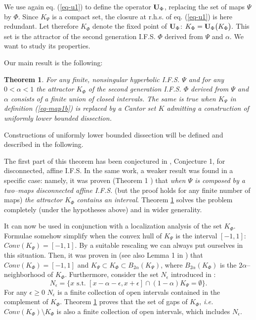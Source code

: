 \documentclass[final,epsfig,amsfont]{article}
\newtheorem{theorem}{Theorem}[section]
\begin{document}
We use again eq. (\ref{eq-u1}) to define the operator ${{\bf U}_{\Phi}}$, replacing the set of maps $\Psi$ by $\Phi$. Since $K_\Psi$ is a compact set, the closure at r.h.s. of eq. (\ref{eq-u1}) is here redundant.
Let therefore $K_\Phi$ denote the fixed point of ${{\bf U}_{\Phi}}$:
$
K_\Phi={{\bf U}_{\Phi}}\big(K_\Phi\big).
$
This set is the attractor of the {second generation I.F.S. $\Phi$ derived from $\Psi$ and $\alpha$}. We want to study its properties.

Our main result is the following: 
\begin{theorem}
For any finite, nonsingular hyperbolic I.F.S. $\Psi$
and for any $0<\alpha<1$ the attractor $K_\Phi$ of the second generation I.F.S. $\Phi$ derived from $\Psi$ and $\alpha$ consists of a finite union of closed intervals.
The same is true when $K_\Psi$ in definition (\ref{eq-map1b}) is replaced by a Cantor set $K$ admitting a construction of uniformly lower bounded dissection.
\label{teo-1}
\end{theorem}
Constructions of uniformly lower bounded dissection will be defined and described in the following.

The first part of this theorem has been conjectured in \cite{intj}, Conjecture 1, for disconnected, affine I.F.S. In the same work, a weaker result was found in a specific case: namely, it was proven (Theorem 1 \cite{intj}) that {\em when $\Psi$ is composed by a two--maps disconnected affine I.F.S. }(but the proof holds for any finite number of maps) {\em the attractor $K_\Phi$ contains an interval}.
Theorem \ref{teo-1} solves the problem completely (under the hypotheses above) and in wider generality.

It can now be used in conjunction with a localization analysis of the set $K_\Phi$. Formulae somehow simplify when the convex hull of $K_\Psi$ is the interval $[-1,1]$: ${{Conv}}(K_\Psi)=[-1,1]$. By a suitable rescaling we can always put ourselves in this situation. Then, it was proven in \cite{nalgo2,arxiv} (see also Lemma 1 in \cite{intj}) that ${{Conv}}(K_\Phi)=[-1,1]$ and
$ K_\Psi \subset K_\Phi \subset B_{2 \alpha}(K_\Psi)$, where $B_{2 \alpha}(K_\Phi)$ is the $2 \alpha$--neighborhood of $K_\Phi$.  Furthermore, consider the set $N_{\epsilon}$ introduced in \cite{intj}:
\begin{equation}
N_{\epsilon} = \{ x \mbox{ s.t. }
[x - \alpha - \epsilon, x + \epsilon] \cap (1-\alpha) K_\Psi = \emptyset \} .
\label{eq-neps}
\end{equation}
For any $\epsilon \geq 0$ $N_{\epsilon}$ is a finite collection of open intervals contained in the complement of $K_\Phi$. Theorem \ref{teo-1} proves that the set of gaps of $K_\Phi$, {\em i.e.}  ${{Conv}}(K_\Phi) \setminus K_\Phi$ is also a finite collection of open intervals, which includes $N_{\epsilon}$.
\end{document}
